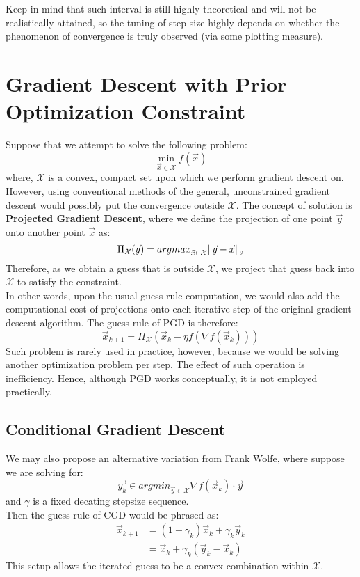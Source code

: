Keep in mind that such interval is still highly theoretical and will not be realistically attained, so the tuning of step size highly depends on whether the phenomenon of convergence is truly observed (via some plotting measure).

\section{Gradient Descent with Prior Optimization Constraint}
Suppose that we attempt to solve the following problem:
\[
    \min_{\vec{x} \in \mathcal{X}} f(\vec{x})
\]
where, $\mathcal{X}$ is a convex, compact set upon which we perform gradient descent on. \\
However, using conventional methods of the general, unconstrained gradient descent would possibly put the convergence outside $\mathcal{X}$.
The concept of solution is \textbf{Projected Gradient Descent}, where we define the projection of one point $\vec{y}$ onto another point $\vec{x}$ as:
\[
    \Pi_{\mathcal{X}} (\vec{y}) = {argmax}_{\vec{x} \in \mathcal{X}} {\| \vec{y} - \vec{x} \|}_{2}^{}
\]
Therefore, as we obtain a guess that is outside $\mathcal{X}$, we project that guess back into $\mathcal{X}$ to satisfy the constraint. \\
In other words, upon the usual guess rule computation, we would also add the computational cost of projections onto each iterative step of the original gradient descent algorithm.
The guess rule of PGD is therefore:
\[
    \vec{x}_{k + 1} = \Pi_{\mathcal{X}} (\vec{x}_k - \eta f(\nabla f(\vec{x}_k)))
\]
Such problem is rarely used in practice, however, because we would be solving another optimization problem per step.
The effect of such operation is inefficiency.
Hence, although PGD works conceptually, it is not employed practically.

\subsection{Conditional Gradient Descent}
We may also propose an alternative variation from Frank Wolfe, where suppose we are solving for:
\[
    \vec{y_k} \in {argmin}_{\vec{y} \in \mathcal{X}} \nabla f(\vec{x}_k) \cdot \vec{y}
\]
and $\gamma$ is a fixed decating stepsize sequence. \\
Then the guess rule of CGD would be phrased as:
\begin{align*}
    \vec{x}_{k + 1}
    &= (1 - \gamma_k) \vec{x}_k + \gamma_k \vec{y}_k \\
    &= \vec{x}_k + \gamma_k (\vec{y}_k - \vec{x}_k)
\end{align*}
This setup allows the iterated guess to be a convex combination within $\mathcal{X}$.
